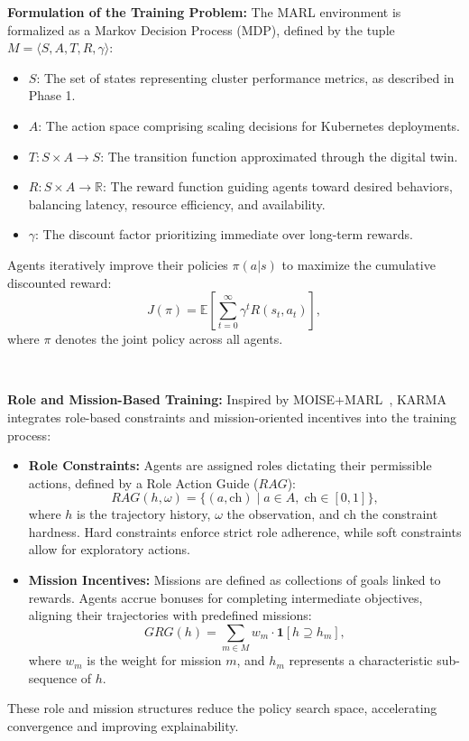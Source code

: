 \documentclass[conference]{IEEEtran}
\begin{document}
\noindent\textbf{Formulation of the Training Problem:} 
The MARL environment is formalized as a Markov Decision Process (MDP), defined by the tuple \( M = \langle S, A, T, R, \gamma \rangle \):
\begin{itemize}
    \item \( S \): The set of states representing cluster performance metrics, as described in Phase 1.
    \item \( A \): The action space comprising scaling decisions for Kubernetes deployments.
    \item \( T: S \times A \rightarrow S \): The transition function approximated through the digital twin.
    \item \( R: S \times A \rightarrow \mathbb{R} \): The reward function guiding agents toward desired behaviors, balancing latency, resource efficiency, and availability.
    \item \( \gamma \): The discount factor prioritizing immediate over long-term rewards.
\end{itemize}
Agents iteratively improve their policies \( \pi(a|s) \) to maximize the cumulative discounted reward:
\[
J(\pi) = \mathbb{E} \left[ \sum_{t=0}^{\infty} \gamma^t R(s_t, a_t) \right],
\]
where \( \pi \) denotes the joint policy across all agents.

\

\noindent\textbf{Role and Mission-Based Training:} 
Inspired by MOISE+MARL~\cite{MOISEMARL2025}, KARMA integrates role-based constraints and mission-oriented incentives into the training process:
\begin{itemize}
    \item \textbf{Role Constraints:} Agents are assigned roles dictating their permissible actions, defined by a Role Action Guide (\( RAG \)):
    \[
    RAG(h, \omega) = \{(a, \text{ch}) \;|\; a \in A, \; \text{ch} \in [0,1]\},
    \]
    where \( h \) is the trajectory history, \( \omega \) the observation, and \( \text{ch} \) the constraint hardness. Hard constraints enforce strict role adherence, while soft constraints allow for exploratory actions.
    \item \textbf{Mission Incentives:} Missions are defined as collections of goals linked to rewards. Agents accrue bonuses for completing intermediate objectives, aligning their trajectories with predefined missions:
    \[
    GRG(h) = \sum_{m \in M} w_m \cdot \mathbf{1}[h \supseteq h_m],
    \]
    where \( w_m \) is the weight for mission \( m \), and \( h_m \) represents a characteristic sub-sequence of \( h \).
\end{itemize}
These role and mission structures reduce the policy search space, accelerating convergence and improving explainability.
\end{document}

